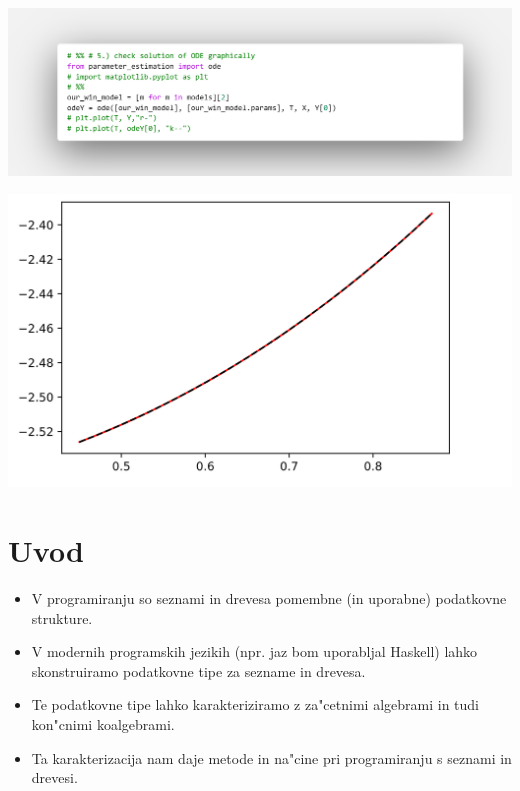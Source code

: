 \documentclass[t,usenames,dvipsnames]{beamer} %
\begin{document}
\begin{frame}
	\includegraphics[width=1.1\paperwidth]
	{code-shots/5graphic-check.png}
\end{frame}

\begin{frame}
	\begin{center}
\includegraphics[height=1\paperheight]
{code-shots/5_1plotScr.png}
	\end{center}
\end{frame}


\section{Uvod}

\begin{frame}

	\begin{itemize}
		\item V programiranju so seznami in drevesa pomembne (in uporabne) podatkovne strukture.
		
		\item V modernih programskih jezikih (npr. jaz bom uporabljal Haskell) lahko skonstruiramo podatkovne tipe za sezname in drevesa.
		
		\item Te podatkovne tipe lahko karakteriziramo z za"cetnimi algebrami in tudi kon"cnimi koalgebrami.
		
		\item Ta karakterizacija nam daje metode in na"cine pri programiranju s seznami in drevesi.
	\end{itemize}
\end{frame}
\end{document}
